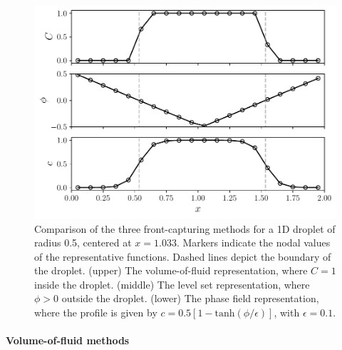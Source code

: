 \begin{figure}%
  \centering
  \includegraphics[width=\columnwidth]{front-capture-comp.pdf}
  \caption{Comparison of the three front-capturing methods for a 1D droplet of radius 0.5, centered at $x=1.033$. Markers indicate the nodal values of the representative functions. Dashed lines depict the boundary of the droplet.
  (upper) The volume-of-fluid representation, where $C=1$ inside the droplet.
  (middle) The level set representation, where $\phi >0$ outside the droplet.
  (lower) The phase field representation, where the profile is given by $c=0.5[1-\mathrm{tanh}(\phi/\epsilon)]$, with $\epsilon=0.1$.}
  \label{fig:front-capture}
\end{figure}


\medskip
\paragraph{\bf Volume-of-fluid methods}

